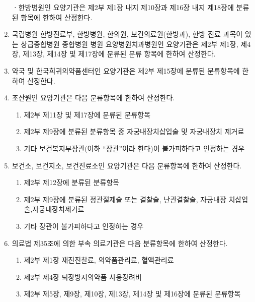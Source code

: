 \begin{enumerate}[1.]
ㆍ한방병원인 요양기관은 제2부 제1장 내지 제10장과 제16장 내지 제18장에 분류된 항목에 한하여 산정한다.
\item 국립병원 한방진료부, 한방병원, 한의원, 보건의료원(한방과), 한방 진료 과목이 있는 상급종합병원\cntrdot{} 종합병원\cntrdot{} 병원\cntrdot{} 요양병원\cntrdot{}치과병원인 요양기관은 제2부 제1장, 제4장, 제13장, 제14장 및 제17장에 분류된 분류 항목에 한하여 산정한다.
\item 약국 및 한국희귀의약품센터인 요양기관은 제2부 제15장에 분류된 분류항목에 한하여 산정한다.
\item 조산원인 요양기관은 다음 분류항목에 한하여 산정한다.
	\begin{enumerate}[가.]\tightlist
	\item 제2부 제11장 및 제17장에 분류된 분류항목
	\item 제2부 제9장에 분류된 분류항목 중 자궁내장치삽입술 및 자궁내장치 제거료
	\item 기타 보건복지부장관(이하 “장관”이라 한다)이 불가피하다고 인정하는 경우
	\end{enumerate}
\item 보건소, 보건지소, 보건진료소인 요양기관은 다음 분류항목에 한하여 산정한다.
	\begin{enumerate}[가.]\tightlist
	\item 제2부 제12장에 분류된 분류항목
	\item 제2부 제9장에 분류된 정관절제술 또는 결찰술, 난관결찰술, 자궁내장 치삽입술,자궁내장치제거료
	\item 기타 장관이 불가피하다고 인정하는 경우
	\end{enumerate}
\item 의료법 제35조에 의한 부속 의료기관은 다음 분류항목에 한하여 산정한다.
	\begin{enumerate}[가.]\tightlist
	\item 제2부 제1장 재진진찰료, 의약품관리료, 혈액관리료
	\item 제2부 제4장 퇴장방지의약품 사용장려비
	\item 제2부 제5장, 제9장, 제10장, 제13장, 제14장 및 제16장에 분류된 분류항목
	\end{enumerate}	
\end{enumerate}

